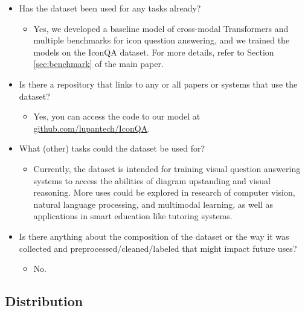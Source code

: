 \documentclass{article}
\begin{document}
\begin{itemize}
    \item Has the dataset been used for any tasks already?
    \begin{itemize}
        \item Yes, we developed a baseline model of cross-modal Transformers and multiple benchmarks for icon question answering, and we trained the models on the IconQA dataset. For more details, refer to Section \ref{sec:benchmark} of the main paper.
    \end{itemize}
    \item Is there a repository that links to any or all papers or systems that
use the dataset?
    \begin{itemize}
        \item Yes, you can access the code to our model at \url{github.com/lupantech/IconQA}.
    \end{itemize}
    \item What (other) tasks could the dataset be used for?
    \begin{itemize}
        \item Currently, the dataset is intended for training visual question answering systems to access the abilities of diagram upstanding and visual reasoning. More uses could be explored in research of computer vision, natural language processing, and multimodal learning, as well as applications in smart education like tutoring systems.
    \end{itemize}
    \item Is there anything about the composition of the dataset or the way
it was collected and preprocessed/cleaned/labeled that might impact future uses?
    \begin{itemize}
        \item No.
    \end{itemize}
    
\end{itemize}

\subsection{Distribution}
\end{document}
